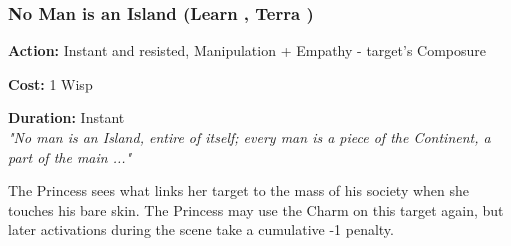 \subsubsection*{No Man is an Island (Learn \textbullet\textbullet, Terra \textbullet)}

\noindent \textbf{Action:} Instant and resisted, Manipulation + Empathy - target's Composure

\noindent \textbf{Cost:} 1 Wisp

\noindent \textbf{Duration:} Instant\\

\noindent \textit{"No man is an Island, entire of itself; every man is a piece of the Continent, a part of the main ..."}

The Princess sees what links her target to the mass of his society when she touches his bare skin. The Princess may use the Charm on this target again, but later activations during the scene take a cumulative -1 penalty.


